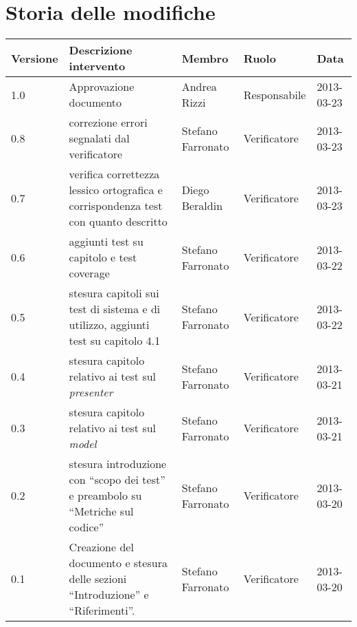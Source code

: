 

\section*{Storia delle modifiche}
\begin{center}
\begin{longtable}{lp{}lll}
\toprule
Versione & Descrizione intervento & Membro & Ruolo & Data\\
\midrule %
1.0 & Approvazione documento& Andrea Rizzi & Responsabile & 2013-03-23\\
0.8 & correzione errori segnalati dal verificatore& Stefano Farronato & Verificatore & 2013-03-23\\
0.7 & verifica correttezza lessico ortografica e corrispondenza test con quanto descritto& Diego Beraldin & Verificatore & 2013-03-23\\
0.6 & aggiunti test su capitolo e test coverage& Stefano Farronato & Verificatore & 2013-03-22\\
0.5 & stesura capitoli sui test di sistema e di utilizzo, aggiunti test su capitolo 4.1& Stefano Farronato & Verificatore & 2013-03-22\\
0.4 & stesura capitolo relativo ai test sul \textit{presenter} & Stefano Farronato & Verificatore & 2013-03-21\\
0.3 & stesura capitolo relativo ai test sul \textit{model} & Stefano Farronato & Verificatore & 2013-03-21\\
0.2 & stesura introduzione con ``scopo dei test'' e preambolo su ``Metriche sul codice''& Stefano Farronato & Verificatore & 2013-03-20\\
0.1 & Creazione del documento e stesura delle sezioni ``Introduzione'' e ``Riferimenti''. & Stefano Farronato & Verificatore & 2013-03-20\\
\bottomrule
\end{longtable}
\end{center}
\newpage



\setcounter{page}{1}
\pagestyle{normal}

